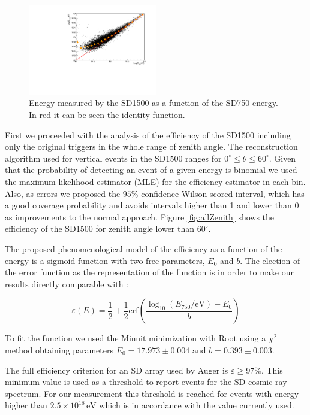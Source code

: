 \documentclass[12pt,a4paper]{article}
\newcommand{\eV}{\, \mathrm{eV}}
\begin{document}
\begin{figure}[h]
    \begin{center}
        \includegraphics[width=0.5\textwidth]{plots/energy45.pdf}  
        \caption{Energy measured by the SD1500 as a function of the SD750 energy. In red it can be seen the identity function.
        \label{fig:energy}}
    \end{center}
\end{figure} 

First we proceeded with the analysis of the efficiency of the SD1500 including only the original triggers in the whole range of zenith angle. The reconstruction algorithm used for vertical events in the SD1500 ranges for $0^{\circ}\leq\theta\leq60^{\circ}$. Given that the probability of detecting an event of a given energy is binomial we used the maximum likelihood estimator (MLE) for the efficiency estimator in each bin. Also, as errors we proposed the $95\%$ confidence Wilson scored interval, which has a good coverage probability and avoids intervals higher than 1 and lower than 0 as improvements to the normal approach. Figure \ref{fig:allZenith} shows the efficiency of the SD1500 for zenith angle lower than $60^{\circ}$. 

The proposed phenomenological model of the efficiency as a function of the energy is a sigmoid function with two free parameters, $E_0$ and $b$. The election of the error function as the representation of the function is in order to make our results directly comparable with \cite{VerticalSpectrum}:

\begin{equation}
\varepsilon(E)=\frac{1}{2} + \frac{1}{2}\mathrm{erf}\left(\frac{\log_{10}(E_{750}/\mathrm{eV})-E_{0}}{b}\right)
\label{eqn:Efficiency}
\end{equation}

To fit the function we used the Minuit minimization with Root using a $\chi^2$ method obtaining parameters $E_0=17.973\pm0.004$ and $b=0.393\pm0.003$.

The full efficiency criterion for an SD array used by Auger is $\varepsilon\geq97\%$. This minimum value is used as a threshold to report events for the SD cosmic ray spectrum. For our measurement this threshold is reached for events with energy higher than $2.5\times10^{18}\eV$ which is in accordance with the value currently used.
\end{document}
